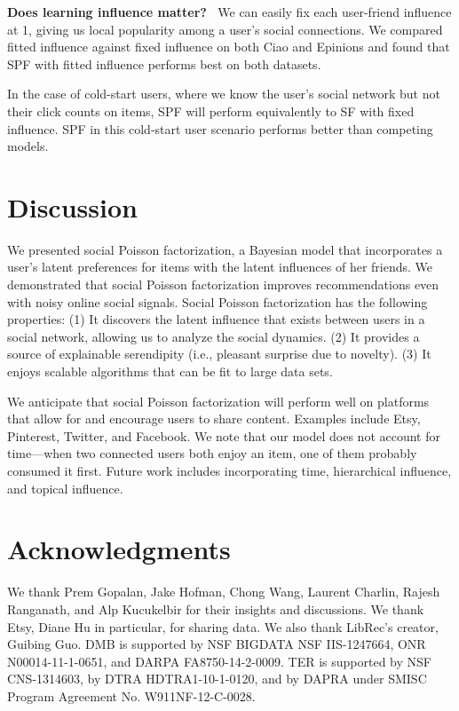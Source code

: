 \documentclass{sig-alternate-2013}
\newcommand{\mypar}[1]{\vspace{0.05in} \noindent \textbf{#1 \,}}
\begin{document}
\mypar{Does learning influence matter?} We can easily fix
each user-friend influence at 1, giving us local popularity among a
user's social connections.  We compared fitted influence against fixed
influence on both Ciao and Epinions and found that SPF with fitted
influence performs best on both datasets.

In the case of cold-start users, where we know the user's social
network but not their click counts on items, SPF will perform
equivalently to SF with fixed influence.  SPF in this
cold-start user scenario performs better than competing models.

\section{Discussion}
We presented social Poisson factorization, a Bayesian model that
incorporates a user's latent preferences for items with the latent
influences of her friends.  We demonstrated that social Poisson factorization improves recommendations
even with noisy online social signals.  Social Poisson
factorization has the following properties: (1) It discovers
the latent influence that exists between users in a social network,
allowing us to analyze the social dynamics. (2) It provides a source
of explainable serendipity (i.e., pleasant surprise due to novelty).
(3) It enjoys scalable algorithms that can be fit to large data sets.

We anticipate that social Poisson factorization will perform well on
platforms that allow for and encourage users to share content.
Examples include Etsy, Pinterest, Twitter, and Facebook.  We note that
our model does not account for time---when two connected
users both enjoy an item, one of them probably consumed it
first. Future work includes incorporating time, hierarchical
influence, and topical influence.

\section{Acknowledgments}
We thank Prem Gopalan, Jake Hofman, Chong Wang, Laurent Charlin, Rajesh Ranganath, and Alp Kucukelbir for their insights and discussions.  We thank Etsy, Diane Hu in particular, for sharing data.  We also thank LibRec's creator, Guibing Guo.
DMB is supported by NSF BIGDATA  NSF IIS-1247664, ONR N00014-11-1-0651, and DARPA FA8750-14-2-0009.
TER is supported by NSF CNS-1314603, by DTRA HDTRA1-10-1-0120, and by DAPRA under SMISC Program Agreement No. W911NF-12-C-0028.
\end{document}
